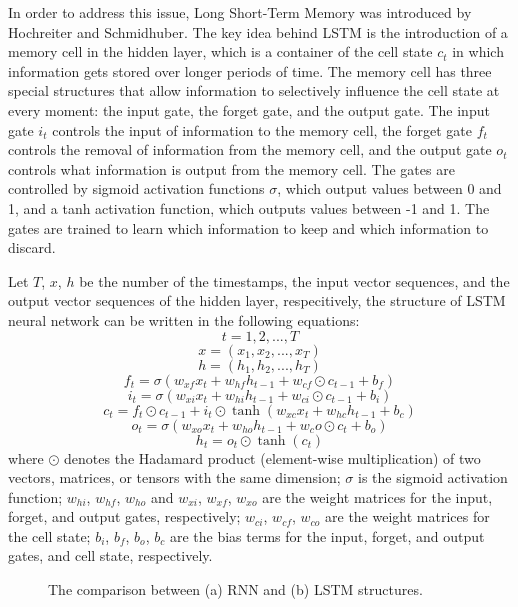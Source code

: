 \documentclass[11pt]{uonthesis}
\begin{document}
In order to address this issue, Long Short-Term Memory was introduced by Hochreiter and Schmidhuber\cite{lstm}. The key idea behind LSTM is the introduction of a memory cell in the hidden layer, which is a container of the cell state $c_t$ in which information gets stored over longer periods of time. The memory cell has three special structures that allow information to selectively influence the cell state at every moment: the input gate, the forget gate, and the output gate. The input gate $i_t$ controls the input of information to the memory cell, the forget gate $f_t$ controls the removal of information from the memory cell, and the output gate $o_t$ controls what information is output from the memory cell. The gates are controlled by sigmoid activation functions $\sigma$, which output values between 0 and 1, and a tanh activation function, which outputs values between -1 and 1. The gates are trained to learn which information to keep and which information to discard.

Let $T$, $x$, $h$ be the number of the timestamps, the input vector sequences, and the output vector sequences of the hidden layer, respecitively, the structure of LSTM neural network can be written in the following equations:
\[t = 1, 2, ..., T\]
\[x = (x_{1}, x_{2},..., x_T)\]
\[h = (h_{1}, h_{2},..., h_T)\]
\[f_t = \sigma(w_{xf} x_t + w_{hf} h_{t-1} + w_{cf} \odot c_{t-1} + b_f )\]
\[i_t = \sigma(w_{xi} x_t + w_{hi} h_{t-1} + w_{ci} \odot c_{t-1} + b_i )\]
\[c_t = f_t \odot c_{t-1} + i_t \odot \tanh(w_{xc} x_t + w_{hc} h_{t-1} + b_c)\] 
\[o_t = \sigma(w_{xo} x_t + w_{ho} h_{t-1} + w_co \odot c_t + b_o)\]
\[h_t = o_t \odot \tanh(c_t)\]
where
$\odot$ denotes the Hadamard product (element-wise multiplication) of two vectors, matrices, or tensors with the same dimension;
$\sigma$ is the sigmoid activation function;
$w_{hi}$, $w_{hf}$, $w_{ho}$ and $w_{xi}$, $w_{xf}$, $w_{xo}$ are the weight matrices for the input, forget, and output gates, respectively;
$w_{ci}$, $w_{cf}$, $w_{co}$ are the weight matrices for the cell state;
$b_i$, $b_f$, $b_o$, $b_c$ are the bias terms for the input, forget, and output gates, and cell state, respectively.


\begin{figure}[h]
    \centering
\caption{The comparison between (a) RNN and (b) LSTM structures.}
\label{bb}
\end{figure}
\end{document}
